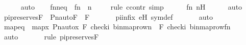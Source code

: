 \begin{isabellebody}
\ \ \ \ \isamarkupfalse%
\ auto\isanewline
\isanewline
\ \ \isamarkupfalse%
\ fnneq\ {\isacharcolon}{\kern0pt}\ {\isachardoublequoteopen}f{\isacharbackquote}{\kern0pt}n\ {\isasymnoteq}\ n{\isachardoublequoteclose}\isanewline
\ \ \ \ \isamarkupfalse%
{\isacharparenleft}{\kern0pt}rule\ ccontr{\isacharcomma}{\kern0pt}\ simp{\isacharparenright}{\kern0pt}\isanewline
\ \ \ \ \isamarkupfalse%
\ fn\ n{\isacharprime}{\kern0pt}H\isanewline
\ \ \ \ \isamarkupfalse%
\ auto\isanewline
\isanewline
\ \ \isamarkupfalse%
\ pi{\isacharunderscore}{\kern0pt}preserves{\isacharunderscore}{\kern0pt}F{\isacharprime}{\kern0pt}\ {\isacharcolon}{\kern0pt}\ {\isachardoublequoteopen}Pn{\isacharunderscore}{\kern0pt}auto{\isacharparenleft}{\kern0pt}{\isasympi}{\isacharparenright}{\kern0pt}{\isacharbackquote}{\kern0pt}F{\isacharprime}{\kern0pt}\ {\isacharequal}{\kern0pt}\ F{\isacharprime}{\kern0pt}{\isachardoublequoteclose}\ \isanewline
\ \ \ \ \isamarkupfalse%
\ piinfix\ eH\ sym{\isacharunderscore}{\kern0pt}def\ \isanewline
\ \ \ \ \isamarkupfalse%
\ auto\isanewline
\isanewline
\ \ \isamarkupfalse%
\ mapeq\ {\isacharcolon}{\kern0pt}\ {\isachardoublequoteopen}map{\isacharparenleft}{\kern0pt}{\isasymlambda}x{\isachardot}{\kern0pt}\ Pn{\isacharunderscore}{\kern0pt}auto{\isacharparenleft}{\kern0pt}{\isasympi}{\isacharparenright}{\kern0pt}{\isacharbackquote}{\kern0pt}x{\isacharcomma}{\kern0pt}\ {\isacharbrackleft}{\kern0pt}F{\isacharprime}{\kern0pt}{\isacharcomma}{\kern0pt}\ check{\isacharparenleft}{\kern0pt}i{\isacharparenright}{\kern0pt}{\isacharcomma}{\kern0pt}\ binmap{\isacharunderscore}{\kern0pt}row{\isacharprime}{\kern0pt}{\isacharparenleft}{\kern0pt}n{\isacharparenright}{\kern0pt}{\isacharbrackright}{\kern0pt}{\isacharparenright}{\kern0pt}\ {\isacharequal}{\kern0pt}\ {\isacharbrackleft}{\kern0pt}F{\isacharprime}{\kern0pt}{\isacharcomma}{\kern0pt}\ check{\isacharparenleft}{\kern0pt}i{\isacharparenright}{\kern0pt}{\isacharcomma}{\kern0pt}\ binmap{\isacharunderscore}{\kern0pt}row{\isacharprime}{\kern0pt}{\isacharparenleft}{\kern0pt}f{\isacharbackquote}{\kern0pt}n{\isacharparenright}{\kern0pt}{\isacharbrackright}{\kern0pt}{\isachardoublequoteclose}\ \isanewline
\ \ \ \ \isamarkupfalse%
\ auto\isanewline
\ \ \ \ \ \ \isamarkupfalse%
{\isacharparenleft}{\kern0pt}rule\ pi{\isacharunderscore}{\kern0pt}preserves{\isacharunderscore}{\kern0pt}F{\isacharprime}{\kern0pt}{\isacharparenright}{\kern0pt}\isanewline
\ \ \ \ \ \isamarkupfalse%

\end{isabellebody}
